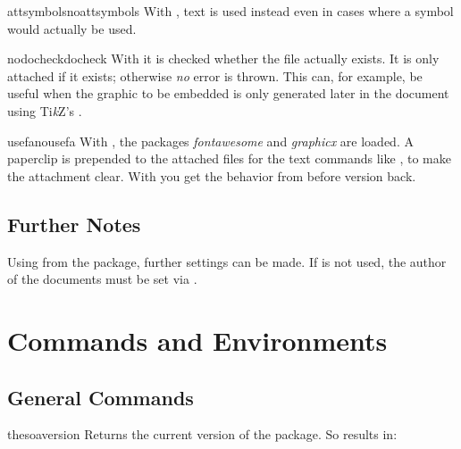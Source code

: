 \documentclass{sopra-base}
\begin{document}
    \begin{argument}{attsymbols}{noattsymbols}
        With , text is used instead even in cases where a symbol
        would actually be used.
    \end{argument}

    \begin{argument}{nodocheck}{docheck}
        With  it is checked whether the file actually exists. It is only attached
        if it exists; otherwise \emph{no} error is thrown. This can, for example,
        be useful when the graphic to be embedded is only generated later in the document
        using Ti\textit{k}Z's .
    \end{argument}

    \begin{argument}{usefa}{nousefa}
        With , the packages \emph{fontawesome} and \emph{graphicx} are loaded. A paperclip is prepended to the attached files for the text commands like , to make the attachment clear. With  you get the behavior from before version  back.
    \end{argument}

\subsection{Further Notes}

    Using  from the  package, further
    settings can be made. If  is not used, the author
    of the documents must be set via .

\section{Commands and Environments}

\subsection{General Commands}

\begin{command}{thesoaversion}{}
    Returns the current version of the package. So  results in: \thesoaversion\\
\end{command}
\end{document}
